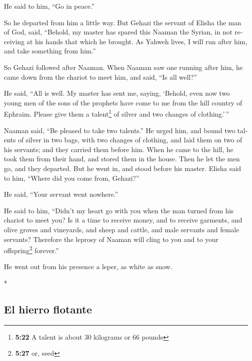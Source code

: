 \begin{paracol}{2}
\begin{otherlanguage}{english}
 He said to him, ``Go in peace.''

So he departed from him a little way.  But Gehazi the
servant of Elisha the man of God, said, ``Behold, my master has spared
this Naaman the Syrian, in not receiving at his hands that which he
brought. As Yahweh lives, I will run after him, and take something from
him.''

 So Gehazi followed after Naaman. When Naaman saw one
running after him, he came down from the chariot to meet him, and said,
``Is all well?''

 He said, ``All is well. My master has sent me, saying,
`Behold, even now two young men of the sons of the prophets have come to
me from the hill country of Ephraim. Please give them a
talent\footnote{\textbf{5:22} A talent is about 30 kilograms or 66
  pounds} of silver and two changes of clothing.'\,''

 Naaman said, ``Be pleased to take two talents.'' He
urged him, and bound two talents of silver in two bags, with two changes
of clothing, and laid them on two of his servants; and they carried them
before him.  When he came to the hill, he took them from
their hand, and stored them in the house. Then he let the men go, and
they departed.  But he went in, and stood before his
master. Elisha said to him, ``Where did you come from, Gehazi?''

He said, ``Your servant went nowhere.''

 He said to him, ``Didn't my heart go with you when the
man turned from his chariot to meet you? Is it a time to receive money,
and to receive garments, and olive groves and vineyards, and sheep and
cattle, and male servants and female servants?  Therefore
the leprosy of Naaman will cling to you and to your offspring\footnote{\textbf{5:27}
  or, seed} forever.''

He went out from his presence a leper, as white as snow.

\end{otherlanguage}

\switchcolumn[0]*

\hypertarget{el-hierro-flotante}{%
\subsection{El hierro flotante}\label{el-hierro-flotante}}

\hypertarget{section-10}{%
}
\end{paracol}
